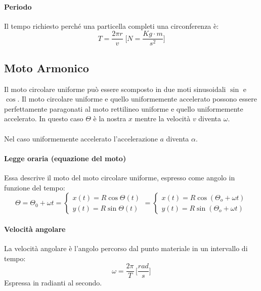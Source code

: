         \paragraph{Periodo} Il tempo richiesto perché una particella completi
        una circonferenza è:
        \begin{equation}
            T = \frac{2\pi r}{v} \; \Bigg[N = \frac{Kg \cdot m}{s^2} \Bigg]
        \end{equation}

    
        \subsection{Moto Armonico}  \label{moto_armonico}
        Il moto circolare uniforme può essere scomposto in due moti sinusoidali 
        $\sin$ e $\cos$.
        Il moto circolare uniforme e quello uniformemente accelerato possono 
        essere perfettamente paragonati al moto rettilineo uniforme e quello 
        uniformemente accelerato. In questo caso $\Theta$ è la nostra $x$ 
        mentre la velocità $v$ diventa $\omega$.\\\\
        Nel caso uniformemente accelerato l'accelerazione $a$ diventa $\alpha$.

        \paragraph{Legge oraria (equazione del moto)} Essa descrive il moto del
        moto circolare uniforme, espresso come angolo in funzione del tempo:
        \begin{equation}
            \Theta = \Theta_0 + \omega t = 
            \begin{cases}
                x(t)=R\cos{\Theta(t)} \\
                y(t)=R\sin{\Theta(t)}
            \end{cases} 
            = 
            \begin{cases}
                x(t)=R\cos{(\Theta_o+\omega t)} \\
                y(t)=R\sin{(\Theta_o+\omega t)}
            \end{cases}
        \end{equation}

        \paragraph{Velocità angolare} La velocità angolare è l'angolo percorso
        dal punto materiale in un intervallo di tempo:
        \begin{equation}
            \omega = \frac{2\pi}{T} \, \Bigg[\frac{rad}{s} \Bigg]
        \end{equation}
        Espressa in radianti al secondo.

